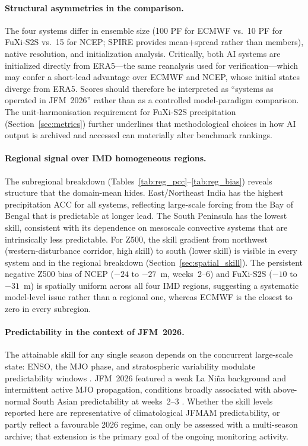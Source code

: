 \documentclass[11pt]{article}
\begin{document}
\paragraph{Structural asymmetries in the comparison.}
The four systems differ in ensemble size (100 PF for ECMWF vs.\ 10 PF
for FuXi-S2S vs.\ 15 for NCEP; SPIRE provides mean$+$spread rather than
members), native resolution, and initialization analysis. Critically,
both AI systems are initialized directly from ERA5---the same reanalysis
used for verification---which may confer a short-lead advantage over
ECMWF and NCEP, whose initial states diverge from ERA5. Scores should
therefore be interpreted as ``systems as operated in JFM~2026'' rather
than as a controlled model-paradigm comparison. The unit-harmonisation
requirement for FuXi-S2S precipitation (Section~\ref{sec:metrics})
further underlines that methodological choices in how AI output is
archived and accessed can materially alter benchmark rankings.

\paragraph{Regional signal over IMD homogeneous regions.}
The subregional breakdown (Tables~\ref{tab:reg_pcc}--\ref{tab:reg_bias})
reveals structure that the domain-mean hides. East/Northeast India has
the highest precipitation ACC for all systems, reflecting large-scale
forcing from the Bay of Bengal that is predictable at longer lead. The
South Peninsula has the lowest skill, consistent with its dependence on
mesoscale convective systems that are intrinsically less predictable.
For Z500, the skill gradient from northwest (western-disturbance
corridor, high skill) to south (lower skill) is visible in every system
and in the regional breakdown (Section~\ref{sec:spatial_skill}). The persistent
negative Z500 bias of NCEP ($-24$ to $-27$~m, weeks~2--6) and FuXi-S2S
($-10$ to $-31$~m) is spatially uniform across all four IMD regions,
suggesting a systematic model-level issue rather than a regional one,
whereas ECMWF is the closest to zero in every subregion.

\paragraph{Predictability in the context of JFM~2026.}
The attainable skill for any single season depends on the concurrent
large-scale state: ENSO, the MJO phase, and stratospheric variability
modulate predictability windows
\citep{mariotti2020,domeisen2022,wheelerhendon2004,zhang2005}. JFM~2026
featured a weak La Ni\~na background and intermittent active MJO
propagation, conditions broadly associated with above-normal South Asian
predictability at weeks~2--3 \citep{deandrade2019}. Whether the skill
levels reported here are representative of climatological JFMAM
predictability, or partly reflect a favourable 2026 regime, can only be
assessed with a multi-season archive; that extension is the primary goal
of the ongoing monitoring activity.
\end{document}
